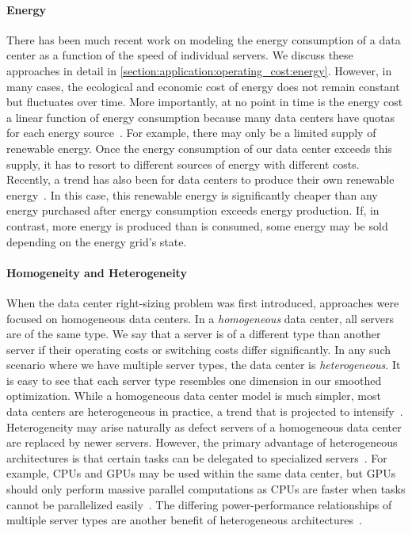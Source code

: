 \paragraph{Energy} There has been much recent work on modeling the energy consumption of a data center as a function of the speed of individual servers. We discuss these approaches in detail in \cref{section:application:operating_cost:energy}. However, in many cases, the ecological and economic cost of energy does not remain constant but fluctuates over time. More importantly, at no point in time is the energy cost a linear function of energy consumption because many data centers have quotas for each energy source~\cite{Miller2021}. For example, there may only be a limited supply of renewable energy. Once the energy consumption of our data center exceeds this supply, it has to resort to different sources of energy with different costs. Recently, a trend has also been for data centers to produce their own renewable energy~\cite{Lin2012}. In this case, this renewable energy is significantly cheaper than any energy purchased after energy consumption exceeds energy production. If, in contrast, more energy is produced than is consumed, some energy may be sold depending on the energy grid's state.

\paragraph{Homogeneity and Heterogeneity} When the data center right-sizing problem was first introduced, approaches were focused on homogeneous data centers. In a \emph{homogeneous} data center, all servers are of the same type. We say that a server is of a different type than another server if their operating costs or switching costs differ significantly. In any such scenario where we have multiple server types, the data center is \emph{heterogeneous}. It is easy to see that each server type resembles one dimension in our smoothed optimization. While a homogeneous data center model is much simpler, most data centers are heterogeneous in practice, a trend that is projected to intensify~\cite{Jin2016}. Heterogeneity may arise naturally as defect servers of a homogeneous data center are replaced by newer servers. However, the primary advantage of heterogeneous architectures is that certain tasks can be delegated to specialized servers~\cite{Jin2016}. For example, CPUs and GPUs may be used within the same data center, but GPUs should only perform massive parallel computations as CPUs are faster when tasks cannot be parallelized easily~\cite{Shan2006}. The differing power-performance relationships of multiple server types are another benefit of heterogeneous architectures~\cite{Jin2016}.

